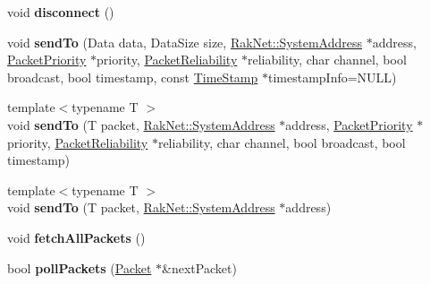 \begin{DoxyCompactItemize}
\item 
\hypertarget{class_champ_net_1_1_network_a6d06699d228d77aff9c358f79c76ed56}{void {\bfseries disconnect} ()}\label{class_champ_net_1_1_network_a6d06699d228d77aff9c358f79c76ed56}

\item 
\hypertarget{class_champ_net_1_1_network_a1490e576ec8bf76357c56b16658a1aa1}{void {\bfseries send\-To} (Data data, Data\-Size size, \hyperlink{struct_rak_net_1_1_system_address}{Rak\-Net\-::\-System\-Address} $\ast$address, \hyperlink{_packet_priority_8h_a659378374e516180f93640c79f59705c}{Packet\-Priority} $\ast$priority, \hyperlink{_packet_priority_8h_ae41fa01235e99dced384d137fa874a7e}{Packet\-Reliability} $\ast$reliability, char channel, bool broadcast, bool timestamp, const \hyperlink{struct_champ_net_1_1_time_stamp}{Time\-Stamp} $\ast$timestamp\-Info=N\-U\-L\-L)}\label{class_champ_net_1_1_network_a1490e576ec8bf76357c56b16658a1aa1}

\item 
\hypertarget{class_champ_net_1_1_network_ad24d4552c6b597b5667965c323221aaa}{{\footnotesize template$<$typename T $>$ }\\void {\bfseries send\-To} (T packet, \hyperlink{struct_rak_net_1_1_system_address}{Rak\-Net\-::\-System\-Address} $\ast$address, \hyperlink{_packet_priority_8h_a659378374e516180f93640c79f59705c}{Packet\-Priority} $\ast$priority, \hyperlink{_packet_priority_8h_ae41fa01235e99dced384d137fa874a7e}{Packet\-Reliability} $\ast$reliability, char channel, bool broadcast, bool timestamp)}\label{class_champ_net_1_1_network_ad24d4552c6b597b5667965c323221aaa}

\item 
\hypertarget{class_champ_net_1_1_network_abcd324ec71ef70454b7e4476f070c932}{{\footnotesize template$<$typename T $>$ }\\void {\bfseries send\-To} (T packet, \hyperlink{struct_rak_net_1_1_system_address}{Rak\-Net\-::\-System\-Address} $\ast$address)}\label{class_champ_net_1_1_network_abcd324ec71ef70454b7e4476f070c932}

\item 
\hypertarget{class_champ_net_1_1_network_a981aef84fbe239079ea158931e5eeb71}{void {\bfseries fetch\-All\-Packets} ()}\label{class_champ_net_1_1_network_a981aef84fbe239079ea158931e5eeb71}

\item 
\hypertarget{class_champ_net_1_1_network_ae01cddc2981169cda9f4d65661c204f6}{bool {\bfseries poll\-Packets} (\hyperlink{class_champ_net_1_1_packet}{Packet} $\ast$\&next\-Packet)}\label{class_champ_net_1_1_network_ae01cddc2981169cda9f4d65661c204f6}


\end{DoxyCompactItemize}
